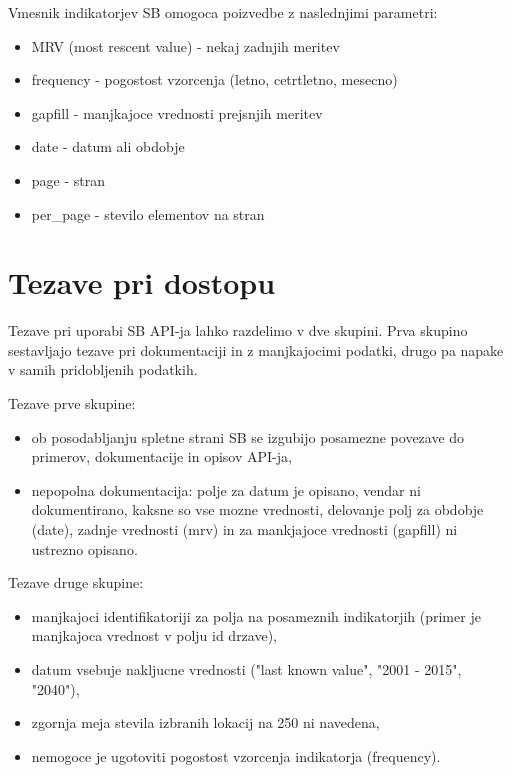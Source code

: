 Vmesnik indikatorjev SB omogoca poizvedbe z naslednjimi parametri:

\begin{itemize}  
\item MRV (most rescent value) - nekaj zadnjih meritev
\item frequency - pogostost vzorcenja (letno, cetrtletno, mesecno)
\item gapfill - manjkajoce vrednosti prejsnjih meritev
\item date - datum ali obdobje
\item page - stran
\item per\_page - stevilo elementov na stran
\end{itemize}


\section{Tezave pri dostopu}


Tezave pri uporabi SB API-ja lahko razdelimo v dve skupini. Prva skupino
sestavljajo tezave pri dokumentaciji in z manjkajocimi podatki, drugo pa
napake v samih pridobljenih podatkih.

Tezave prve skupine:

\begin{itemize}  
\item ob posodabljanju spletne strani SB se izgubijo posamezne povezave do 
  primerov, dokumentacije in opisov API-ja,
\item nepopolna dokumentacija:
\subitem polje za datum je opisano, vendar ni dokumentirano, kaksne so vse mozne 
    vrednosti,
\subitem delovanje polj za obdobje (date), zadnje vrednosti (mrv) in za mankjajoce
    vrednosti (gapfill) ni ustrezno opisano.
\end{itemize}  

Tezave druge skupine:


\begin{itemize}  
\item manjkajoci identifikatoriji za polja na posameznih indikatorjih (primer je
  manjkajoca vrednost v polju id drzave),
\item datum vsebuje nakljucne vrednosti ("last known value", "2001 - 2015", "2040"),
\item zgornja meja stevila izbranih lokacij na 250 ni navedena,
\item nemogoce je ugotoviti pogostost vzorcenja indikatorja (frequency).
\end{itemize}  







